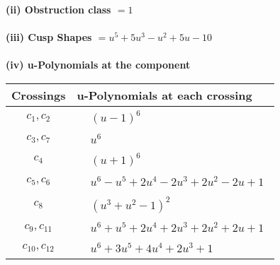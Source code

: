 \documentclass[1p]{elsarticle_modified}
\theoremstyle{definition}
\begin{document}
\flushleft \textbf{(ii) Obstruction class $= 1$}\\~\\
\flushleft \textbf{(iii) Cusp Shapes $= u^5+5 u^3- u^2+5 u-10$}\\~\\
\newpage\renewcommand{\arraystretch}{1}
\flushleft \textbf{(iv) u-Polynomials at the component}\newline \\
\begin{tabular}{m{50pt}|m{274pt}}
Crossings & \hspace{64pt}u-Polynomials at each crossing \\
\hline $$\begin{aligned}c_{1},c_{2}\end{aligned}$$&$\begin{aligned}
&(u-1)^6
\end{aligned}$\\
\hline $$\begin{aligned}c_{3},c_{7}\end{aligned}$$&$\begin{aligned}
&u^6
\end{aligned}$\\
\hline $$\begin{aligned}c_{4}\end{aligned}$$&$\begin{aligned}
&(u+1)^6
\end{aligned}$\\
\hline $$\begin{aligned}c_{5},c_{6}\end{aligned}$$&$\begin{aligned}
&u^6- u^5+2 u^4-2 u^3+2 u^2-2 u+1
\end{aligned}$\\
\hline $$\begin{aligned}c_{8}\end{aligned}$$&$\begin{aligned}
&(u^3+u^2-1)^2
\end{aligned}$\\
\hline $$\begin{aligned}c_{9},c_{11}\end{aligned}$$&$\begin{aligned}
&u^6+u^5+2 u^4+2 u^3+2 u^2+2 u+1
\end{aligned}$\\
\hline $$\begin{aligned}c_{10},c_{12}\end{aligned}$$&$\begin{aligned}
&u^6+3 u^5+4 u^4+2 u^3+1
\end{aligned}$\\
\hline
\end{tabular}\\~\\
\end{document}
